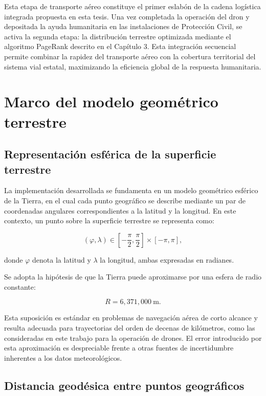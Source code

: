 \documentclass[
  spanish,
  us-letterpaper,
]{scrreprt}
\numberwithin{equation}{section}
\begin{document}
Esta etapa de transporte aéreo constituye el primer eslabón de la cadena
logística integrada propuesta en esta tesis. Una vez completada la
operación del dron y depositada la ayuda humanitaria en las
instalaciones de Protección Civil, se activa la segunda etapa: la
distribución terrestre optimizada mediante el algoritmo PageRank
descrito en el Capítulo 3. Esta integración secuencial permite combinar
la rapidez del transporte aéreo con la cobertura territorial del sistema
vial estatal, maximizando la eficiencia global de la respuesta
humanitaria.

\section{Marco del modelo geométrico
terrestre}\label{marco-del-modelo-geomuxe9trico-terrestre}

\subsection{Representación esférica de la superficie
terrestre}\label{representaciuxf3n-esfuxe9rica-de-la-superficie-terrestre}

La implementación desarrollada se fundamenta en un modelo geométrico
esférico de la Tierra, en el cual cada punto geográfico se describe
mediante un par de coordenadas angulares correspondientes a la latitud y
la longitud. En este contexto, un punto sobre la superficie terrestre se
representa como:

\[
(\varphi, \lambda) \in \left[-\frac{\pi}{2}, \frac{\pi}{2}\right] \times [-\pi, \pi],
\]

donde \(\varphi\) denota la latitud y \(\lambda\) la longitud, ambas
expresadas en radianes.

Se adopta la hipótesis de que la Tierra puede aproximarse por una esfera
de radio constante:

\[
R = 6,\!371,\!000 \ \text{m}.
\]

Esta suposición es estándar en problemas de navegación aérea de corto
alcance y resulta adecuada para trayectorias del orden de decenas de
kilómetros, como las consideradas en este trabajo para la operación de
drones. El error introducido por esta aproximación es despreciable
frente a otras fuentes de incertidumbre inherentes a los datos
meteorológicos.

\subsection{Distancia geodésica entre puntos
geográficos}\label{distancia-geoduxe9sica-entre-puntos-geogruxe1ficos}
\end{document}
